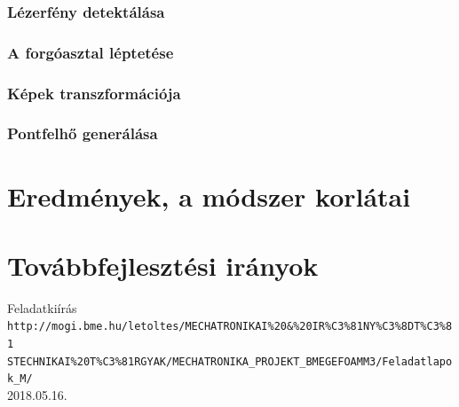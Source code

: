 \documentclass[12pt,a4paper]{article}
\begin{document}
\subsubsection{Lézerfény detektálása}
\subsubsection{A forgóasztal léptetése}
\subsubsection{Képek transzformációja}
\subsubsection{Pontfelhő generálása}
\section{Eredmények, a módszer korlátai}
\section{Továbbfejlesztési irányok}
\newpage
\begin{thebibliography}{9} 
Feladatkiírás\\
\texttt{http://mogi.bme.hu/letoltes/MECHATRONIKAI\%20\&\%20IR\%C3\%81NY\%C3\%8DT\%C3\%81\\
STECHNIKAI\%20T\%C3\%81RGYAK/MECHATRONIKA\_PROJEKT\_BMEGEFOAMM3/Feladatlapok\_M/}\\
2018.05.16.
\end{thebibliography}
\end{document}
